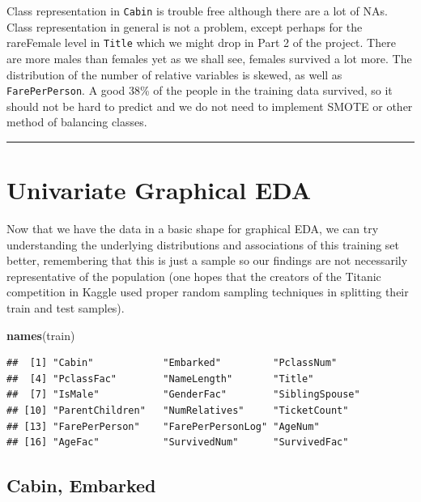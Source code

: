 \documentclass[]{article}
\newenvironment{Shaded}{\begin{snugshade}}{\end{snugshade}}
\newcommand{\KeywordTok}[1]{\textcolor[rgb]{0.13,0.29,0.53}{\textbf{#1}}}
\newcommand{\NormalTok}[1]{#1}
\begin{document}
Class representation in \texttt{Cabin} is trouble free although there
are a lot of NAs. Class representation in general is not a problem,
except perhaps for the rareFemale level in \texttt{Title} which we might
drop in Part 2 of the project. There are more males than females yet as
we shall see, females survived a lot more. The distribution of the
number of relative variables is skewed, as well as
\texttt{FarePerPerson}. A good 38\% of the people in the training data
survived, so it should not be hard to predict and we do not need to
implement SMOTE or other method of balancing classes.

\begin{center}\rule{0.5\linewidth}{\linethickness}\end{center}

\section{Univariate Graphical EDA}\label{univariate-graphical-eda}

Now that we have the data in a basic shape for graphical EDA, we can try
understanding the underlying distributions and associations of this
training set better, remembering that this is just a sample so our
findings are not necessarily representative of the population (one hopes
that the creators of the Titanic competition in Kaggle used proper
random sampling techniques in splitting their train and test samples).

\begin{Shaded}
\begin{Highlighting}[]
\KeywordTok{names}\NormalTok{(train)}
\end{Highlighting}
\end{Shaded}

\begin{verbatim}
##  [1] "Cabin"            "Embarked"         "PclassNum"       
##  [4] "PclassFac"        "NameLength"       "Title"           
##  [7] "IsMale"           "GenderFac"        "SiblingSpouse"   
## [10] "ParentChildren"   "NumRelatives"     "TicketCount"     
## [13] "FarePerPerson"    "FarePerPersonLog" "AgeNum"          
## [16] "AgeFac"           "SurvivedNum"      "SurvivedFac"
\end{verbatim}

\subsection{Cabin, Embarked}\label{cabin-embarked}
\end{document}
